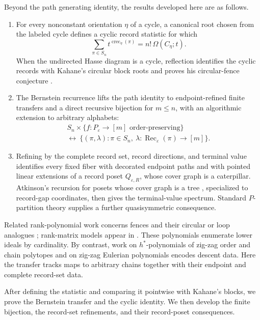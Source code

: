 \documentclass[10pt,a4paper]{amsart}
\newcommand{\eps}{\varepsilon}
\begin{document}
Beyond the path generating identity, the results developed here are as
follows.
\begin{enumerate}[label=(\roman*)]
\item For every nonconstant orientation \(\eta\) of a cycle, a canonical root
chosen from the labeled cycle defines a cyclic record statistic for which
\[
\sum_{\pi\in S_n}t^{\operatorname{crec}_\eta(\pi)}
=n!\,\Omega(C_\eta;t).
\]
When the undirected Hasse diagram is a cycle, reflection identifies the cyclic
records with Kahane's circular block roots and proves his circular-fence
conjecture \cite[Conjecture~4.8]{Kahane}.
\item The Bernstein recurrence lifts the path identity to endpoint-refined
finite transfers and a direct recursive bijection for \(m\le n\), with an
algorithmic extension to arbitrary alphabets:
\begin{multline*}
S_n\times\{f:P_\eps\to[m]\text{ order-preserving}\}
\\[-2pt]
\longleftrightarrow\ 
\{(\pi,\lambda):\pi\in S_n,\ 
  \lambda:\operatorname{Rec}_\eps(\pi)\to[m]\}.
\end{multline*}
\item Refining by the complete record set, record directions, and terminal
value identifies every fixed fiber with decorated endpoint paths and with
pointed linear extensions of a record poset \(Q_{\eps,R}\), whose cover graph
is a caterpillar.  Atkinson's recursion for posets whose cover graph is a tree
\cite{AtkinsonTree}, specialized to record-gap coordinates, then gives the
terminal-value spectrum.  Standard \(P\)-partition theory supplies a further
quasisymmetric consequence.
\end{enumerate}

Related rank-polynomial work concerns fences \cite{MGO,KOR} and their circular
or loop analogues \cite{Chainlink,KLL}; rank-matrix models appear in
\cite{KantarciOguz}.  These polynomials enumerate lower ideals by cardinality.
By contrast, work on \(h^\ast\)-polynomials of zig-zag order and chain
polytopes \cite{CZ,CS} and on zig-zag Eulerian polynomials \cite{PZ} encodes
descent data.  Here the transfer tracks maps to arbitrary chains together with
their endpoint and complete record-set data.

After defining the statistic and comparing it pointwise with Kahane's blocks,
we prove the Bernstein transfer and the cyclic identity.  We then develop the
finite bijection, the record-set refinements, and their record-poset
consequences.
\end{document}
